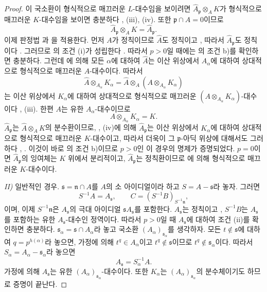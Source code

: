 \begin{proof}
이 국소환이 형식적으로 매끄러운 $L$-대수임을 보이려면
$\widehat A_\mathfrak p\otimes_A K$가 형식적으로 매끄러운
$K$-대수임을 보이면 충분하다 , (iii), (iv). 또한
$\mathfrak p\cap A=0$이므로
\[
  \widehat A_\mathfrak p\otimes_A K=\widehat A_\mathfrak p.
\]
이제 판정법 과 을 적용한다. 먼저
$A$가 정칙이므로 $\widehat A$도 정칙이고 , 따라서
$\widehat A_\mathfrak p$도 정칙이다 . 그러므로
의 조건 (i)가 성립한다 .
따라서 $p>0$일 때에는 의 조건 b)를 확인하면
충분하다. 그런데 에 의해 모든 $\alpha$에 대하여
$\widehat A$는 이산 위상에서 $A_\alpha$에 대하여 상대적으로
형식적으로 매끄러운 $A$-대수이다. 따라서
\[
  \widehat A\otimes_{A_\alpha}K_\alpha
  =\widehat A\otimes_A(A\otimes_{A_\alpha}K_\alpha)
\]
는 이산 위상에서 $K_\alpha$에 대하여 상대적으로 형식적으로 매끄러운
$(A\otimes_{A_\alpha}K_\alpha)$-대수이다
, (iii). 한편 $A$는 유한 $A_\alpha$-대수이므로
\[
  A\otimes_{A_\alpha}K_\alpha=K.
\]
$\widehat A_\mathfrak p$는 $\widehat A\otimes_A K$의 분수환이므로,
, (iv)에 의해 $\widehat A_\mathfrak p$는 이산
위상에서 $K_\alpha$에 대하여 상대적으로 형식적으로 매끄러운
$K$-대수이고, 따라서 더욱이 그 $\mathfrak p$-아딕 위상에 대해서도
그러하다 , . 이것이 바로
의 조건 b)이므로 $p>0$인 이 경우의 명제가
증명되었다. $p=0$이면 $\widehat A_\mathfrak p$의 잉여체는 $K$ 위에서
분리적이고, $\widehat A_\mathfrak p$는 정칙환이므로
에 의해 형식적으로 매끄러운 $K$-대수이다.

\emph{II)} 일반적인 경우. $\mathfrak s=\mathfrak n\cap A$를 $A$의
소 아이디얼이라 하고 $S=A-\mathfrak s$라 놓자. 그러면
\[
  S^{-1}A=A_\mathfrak s,
  \qquad C=(S^{-1}B)_{S^{-1}\mathfrak n},
\]
이며, 이제 $S^{-1}\mathfrak n$은 $A_\mathfrak s$의 극대 아이디얼
$\mathfrak sA_\mathfrak s$를 포함한다. $A_\mathfrak s$는 정칙이고
, $S^{-1}B$는 $A_\mathfrak s$를 포함하는 유한
$A_\mathfrak s$-대수인 정역이다. 따라서 $p>0$일 때
$A_\mathfrak s$에 대하여 조건 (ii)를 확인하면 충분하다.
$\mathfrak s_\alpha=\mathfrak s\cap A_\alpha$라 놓고 국소환
$(A_\alpha)_{\mathfrak s_\alpha}$를 생각하자. 모든
$t\notin\mathfrak s$에 대하여 $q=p^{h(\alpha)}$라 놓으면, 가정에 의해
$t^q\in A_\alpha$이고 $t^q\notin\mathfrak s$이므로
$t^q\notin\mathfrak s_\alpha$이다. 따라서
$S_\alpha=A_\alpha-\mathfrak s_\alpha$라 놓으면
\[
  A_\mathfrak s=S_\alpha^{-1}A.
\]
가정에 의해 $A_\mathfrak s$는 유한
$(A_\alpha)_{\mathfrak s_\alpha}$-대수이다. 또한 $K_\alpha$는
$(A_\alpha)_{\mathfrak s_\alpha}$의 분수체이기도 하므로 증명이 끝난다.
\end{proof}

